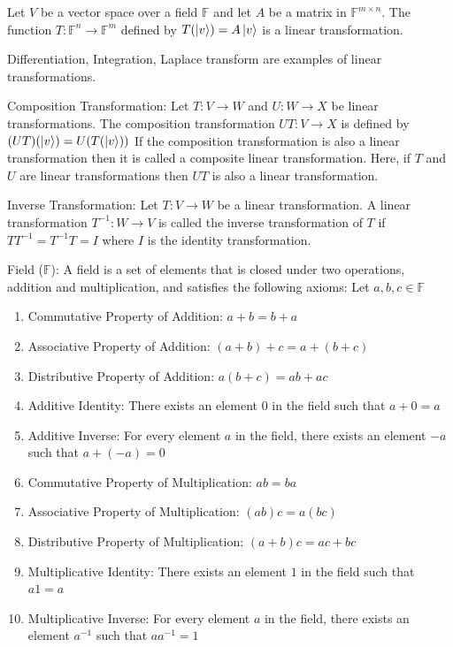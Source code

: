 \begin{example}
    Let $V$ be a vector space over a field $\mathbb{F}$ and let $A$ be a matrix in $\mathbb{F}^{m\times n}$. The function $T:\mathbb{F}^{n}\rightarrow\mathbb{F}^{m}$ defined by $T(\ket{v})=A\ket{v}$ is a linear transformation.
\end{example}

\begin{example}
    Differentiation, Integration, Laplace transform are examples of linear transformations.
\end{example}

\begin{definition}
    Composition Transformation: Let $T:V\rightarrow W$ and $U:W\rightarrow X$ be linear transformations. The composition transformation $UT:V\rightarrow X$ is defined by $(UT)(\ket{v})=U(T(\ket{v}))$
    If the composition transformation is also a linear transformation then it is called a composite linear transformation. Here, if $T$ and $U$ are linear transformations then $UT$ is also a linear transformation.
\end{definition}

\begin{definition}
    Inverse Transformation: Let $T:V\rightarrow W$ be a linear transformation. A linear transformation $T^{-1}:W\rightarrow V$ is called the inverse transformation of $T$ if $TT^{-1}=T^{-1}T=I$ where $I$ is the identity transformation.
\end{definition}

\begin{definition}
    Field ($\mathbb{F}$): A field is a set of elements that is closed under two operations, addition and multiplication, and satisfies the following axioms:
    Let $a,b,c\in\mathbb{F}$
    \begin{enumerate}
        \item Commutative Property of Addition: $a+b=b+a$
        \item Associative Property of Addition: $(a+b)+c=a+(b+c)$
        \item Distributive Property of Addition: $a(b+c)=ab+ac$
        \item Additive Identity: There exists an element $0$ in the field such that $a+0=a$
        \item Additive Inverse: For every element $a$ in the field, there exists an element $-a$ such that $a+(-a)=0$
        \item Commutative Property of Multiplication: $ab=ba$
        \item Associative Property of Multiplication: $(ab)c=a(bc)$
        \item Distributive Property of Multiplication: $(a+b)c=ac+bc$
        \item Multiplicative Identity: There exists an element $1$ in the field such that $a1=a$
        \item Multiplicative Inverse: For every element $a$ in the field, there exists an element $a^{-1}$ such that $aa^{-1}=1$
    \end{enumerate}
\end{definition}

